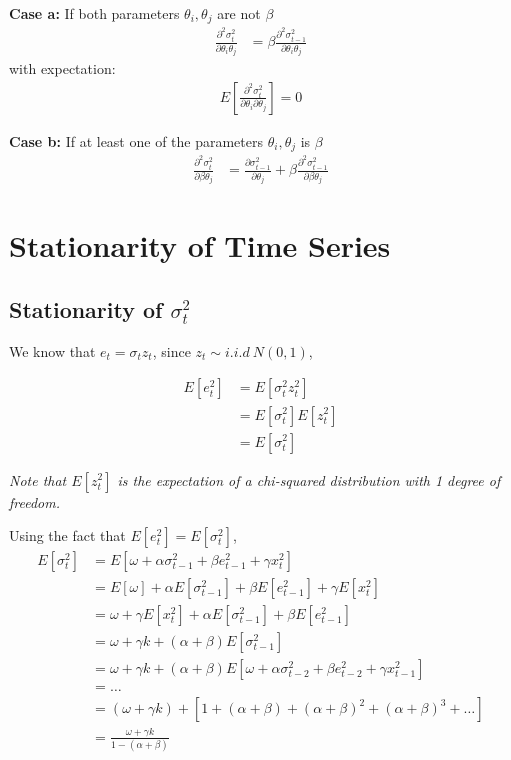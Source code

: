 \documentclass{article}
\begin{document}
\textbf{Case a:} If both parameters $\theta_i, \theta_j$ are not $\beta$
\begin{align}
    \frac{\partial^2 \sigma_{t}^2}{\partial \theta_i \theta_j} &= \beta \frac{\partial^2 \sigma_{t-1}^2}{\partial \theta_i \theta_j}
\end{align}
with expectation:
\begin{align}
    E\left[\frac{\partial^2 \sigma_{t}^2}{\partial\theta_i \partial\theta_j}\right] = 0
\end{align}

\textbf{Case b:} If at least one of the parameters $\theta_i, \theta_j$ is $\beta$
\begin{align}
    \frac{\partial^2 \sigma_{t}^2}{\partial \beta \theta_j} &= \frac{\partial \sigma_{t-1}^2}{\partial \theta_j } + \beta \frac{\partial^2 \sigma_{t-1}^2}{\partial \beta \theta_j}
\end{align}


\section{Stationarity of Time Series}

\subsection{Stationarity of $\sigma_t^2$}

We know that $e_t = \sigma_t z_t$, since $z_t \sim i.i.d \ N(0,1)$,

\[
\begin{split}
E[e_t^2] &= E[\sigma_t^2 z_t^2] \\
&= E[\sigma_t^2] E[z_t^2] \\
&= E[\sigma_t^2]
\end{split}
\]

\textit{Note that $E[z_t^2]$ is the expectation of a chi-squared distribution with 1 degree of freedom.}

Using the fact that $E[e_t^2] = E[\sigma_t^2]$,
\[
\begin{split}
    E[\sigma_t^2] &= E[\omega + \alpha \sigma_{t-1}^2 + \beta e_{t-1}^2 + \gamma x_t^2] \\
    &= E[\omega] + \alpha E[\sigma_{t-1}^2] + \beta E[e_{t-1}^2] + \gamma E[x_t^2] \\
    &= \omega + \gamma E[x_t^2] + \alpha E[\sigma_{t-1}^2] + \beta E[e_{t-1}^2] \\
    &= \omega + \gamma k + (\alpha + \beta) E[\sigma_{t-1}^2] \\
    &= \omega + \gamma k + (\alpha + \beta) E[\omega + \alpha \sigma_{t-2}^2 + \beta e_{t-2}^2 + \gamma x_{t-1}^2] \\
    &= \ldots \\
    &= (\omega + \gamma k) + [1+ (\alpha + \beta) + (\alpha + \beta)^2 + (\alpha + \beta)^3 + \ldots] \\
    &= \frac{\omega + \gamma k}{1-(\alpha+\beta)}
\end{split}
\]
\end{document}
